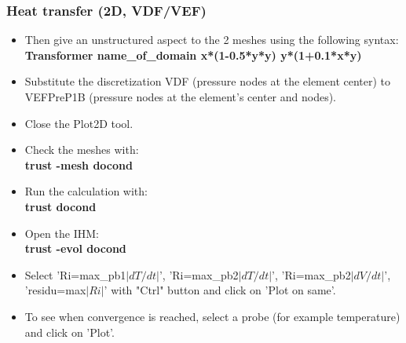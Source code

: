 \documentclass[10pt, hyperref={unicode=true,pdfusetitle, bookmarks=true,bookmarksnumbered=false,bookmarksopen=false, breaklinks=false,pdfborder={0 0 1},backref=true,colorlinks=true,linkcolor=darkblue,pageanchor}]{beamer}
\begin{document}
\begin{frame}
\frametitle{Heat transfer (2D, VDF/VEF)}
\begin{block}{}

\begin{itemize}
\item Then give an unstructured aspect to the 2 meshes using the following syntax: \\
\textbf{Transformer name\_of\_domain \; x*(1-0.5*y*y) \; y*(1+0.1*x*y)}

\item Substitute the discretization VDF (pressure nodes at the element center) to VEFPreP1B (pressure nodes at the element's center and nodes).

\item Close the Plot2D tool.

\item Check the meshes with: \\
\textbf{trust -mesh docond}

\item Run the calculation with:\\
\textbf{trust docond }

\item Open the IHM:\\
\textbf{trust -evol docond }

\item Select 'Ri=max\_pb1$|dT/dt|$', 'Ri=max\_pb2$|dT/dt|$', 'Ri=max\_pb2$|dV/dt|$', 'residu=max$|Ri|$' with "Ctrl" button and click on 'Plot on same'.

\item To see when convergence is reached, select a probe (for example temperature) and click on 'Plot'. 

\end{itemize}

\end{block}
\end{frame}
\end{document}
